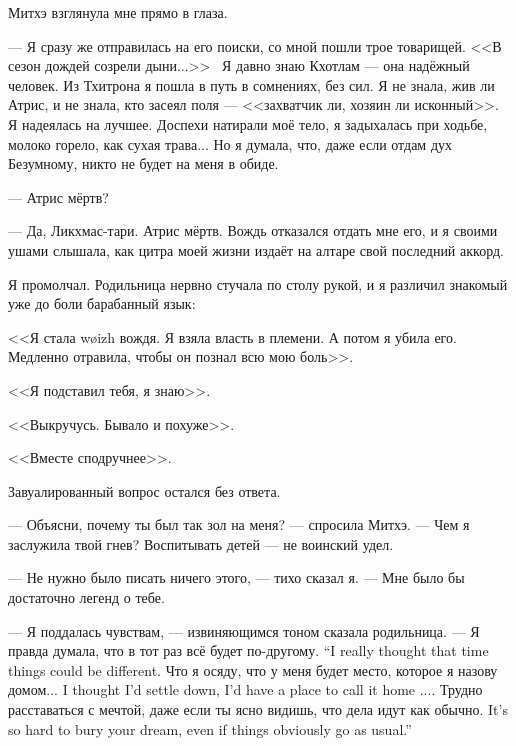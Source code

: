 Митхэ взглянула мне прямо в глаза.

--- Я сразу же отправилась на его поиски, со мной пошли трое товарищей.
<<В сезон дождей созрели дыни...>>\FM\
Я давно знаю Кхотлам --- она надёжный человек.
Из Тхитрона я пошла в путь в сомнениях, без сил.
Я не знала, жив ли Атрис, и не знала, кто засеял поля --- <<захватчик ли, хозяин ли исконный>>\FM.
Я надеялась на лучшее.
Доспехи натирали моё тело, я задыхалась при ходьбе, молоко горело, как сухая трава...
Но я думала, что, даже если отдам дух Безумному, никто не будет на меня в обиде.

--- Атрис мёртв?

--- Да, Ликхмас-тари.
Атрис мёртв.
Вождь отказался отдать мне его, и я своими ушами слышала, как цитра моей жизни издаёт на алтаре свой последний аккорд.

Я промолчал.
Родильница нервно стучала по столу рукой, и я различил знакомый уже до боли барабанный язык:

<<Я стала w\o izh вождя.
Я взяла власть в племени.
А потом я убила его.
Медленно отравила, чтобы он познал всю мою боль>>.

<<Я подставил тебя, я знаю>>.

<<Выкручусь.
Бывало и похуже>>.

<<Вместе сподручнее>>.

Завуалированный вопрос остался без ответа.

--- Объясни, почему ты был так зол на меня? --- спросила Митхэ.
--- Чем я заслужила твой гнев?
Воспитывать детей --- не воинский удел.

--- Не нужно было писать ничего этого, --- тихо сказал я.
--- Мне было бы достаточно легенд о тебе.

--- Я поддалась чувствам, --- извиняющимся тоном сказала родильница.
\ml{$0$}
{--- Я правда думала, что в тот раз всё будет по-другому.}
{``I really thought that time things could be different.}
{Что я осяду, что у меня будет место, которое я назову домом...}
{I thought I'd settle down, I'd have a place to call it home ....}
\ml{$0$}
{Трудно расставаться с мечтой, даже если ты ясно видишь, что дела идут как обычно.}
{It's so hard to bury your dream, even if things obviously go as usual.''}

